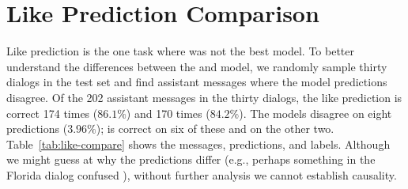 \section{Like Prediction Comparison}
\label{apx:like-compare}
Like prediction is the one task where \charm{} was not the best model.
To better understand the differences between the \charm{} and \bert{} model, we randomly sample thirty dialogs in the test set and find assistant messages where the model predictions disagree.
Of the 202 assistant messages in the thirty dialogs, the \bert{} like prediction is correct 174 times ($86.1\%$) and \charm{} 170 times ($84.2\%$).
The models disagree on eight predictions ($3.96\%$); \bert{} is correct on six of these and \charm{} on the other two.
Table~\ref{tab:like-compare} shows the messages, predictions, and labels.
Although we might guess at why the predictions differ (e.g., perhaps something in the Florida dialog confused \bert{}), without further analysis we cannot establish causality.

